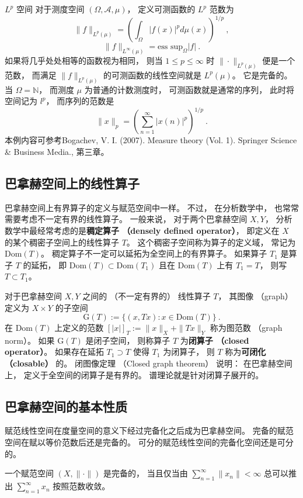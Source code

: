 \begin{example}{$L^p$ 空间}
对于测度空间 $(\Omega,\mathcal{A},\mu)$， 定义可测函数的 $L^p$ 范数为
$$
\|f\|_{L^p(\mu)}=\left(\int_\Omega |f(x)|^pd\mu(x)\right)^{1/p}~,
$$
$$
\|f\|_{L^\infty(\mu)}=\text{ess sup}_{\Omega}|f|~.
$$
如果将几乎处处相等的函数视为相同， 则当 $1\leq p\leq\infty$ 时 $\|\cdot\|_{L^p(\mu)}$ 便是一个范数， 而满足 $\|f\|_{L^p(\mu)}$ 的可测函数的线性空间就是 $L^p(\mu)$。 它是完备的。 当 $\Omega=\mathbb{N}$， 而测度 $\mu$ 为普通的计数测度时， 可测函数就是通常的序列， 此时将空间记为 $l^p$， 而序列的范数是
$$
\|x\|_p=\left(\sum_{n=1}^\infty|x(n)|^p\right)^{1/p}~.
$$
本例内容可参考Bogachev, V. I. (2007). Measure theory (Vol. 1). Springer Science \& Business Media., 第三章。
\end{example}

\subsection{巴拿赫空间上的线性算子}
巴拿赫空间上有界算子的定义与赋范空间中一样。 不过， 在分析数学中， 也常常需要考虑不一定有界的线性算子。 一般来说， 对于两个巴拿赫空间 $X,Y$， 分析数学中最经常考虑的是\textbf{稠定算子 （densely defined operator）}， 即定义在 $X$ 的某个稠密子空间上的线性算子 $T$。 这个稠密子空间称为算子的定义域， 常记为 $\text{Dom}(T)$。 稠定算子不一定可以延拓为全空间上的有界算子。 如果算子 $T_1$ 是算子 $T$ 的延拓， 即 $\text{Dom}(T)\subset \text{Dom}(T_1)$ 且在 $\text{Dom}(T)$ 上有 $T_1=T$， 则写 $T\subset T_1$。

对于巴拿赫空间 $X,Y$ 之间的 （不一定有界的） 线性算子 $T$， 其图像 （graph） 定义为 $X\times Y$ 的子空间
$$
\text{G}(T):=\{(x,Tx):x\in \text{Dom}(T)\}~.
$$
在 $\text{Dom}(T)$ 上定义的范数 $[|x|]_T:=\|x\|_X+\|Tx\|_Y$ 称为图范数 （graph norm）。 如果 $\text{G}(T)$ 是闭子空间， 则称算子 $T$ 为\textbf{闭算子 （closed operator）}。 如果存在延拓 $T_1\supset T$ 使得 $T_1$ 为闭算子， 则 $T$ 称为\textbf{可闭化 （closable）} 的。 闭图像定理 （Closed graph theorem） 说明： 在巴拿赫空间上， 定义于全空间的闭算子是有界的。 谱理论就是针对闭算子展开的。

\subsection{巴拿赫空间的基本性质}
赋范线性空间在度量空间的意义下经过完备化之后成为巴拿赫空间。 完备的赋范空间在赋以等价范数后还是完备的。 可分的赋范线性空间的完备化空间还是可分的。 

一个赋范空间 $(X,\|\cdot\|)$ 是完备的， 当且仅当由 $\sum _{n=1}^{\infty }\|x_{n}\|<\infty $ 总可以推出 $\sum _{n=1}^{\infty }x_{n}$ 按照范数收敛。

